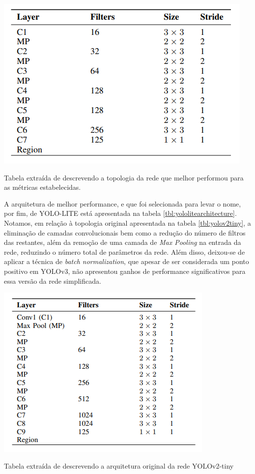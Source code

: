 \documentclass[]{politex}
\begin{document}
\begin{table}[ht]
  \centering
  \includegraphics[scale=0.55]{img/yololite.png}
  \caption{Tabela extraída de \citeyear{yololite} \citeauthor{yololite} descrevendo a topologia da rede que melhor performou para as métricas estabelecidas.}
  \label{tbl:yololitearchitecture}
\end{table}

A arquitetura de melhor performance, e que foi selecionada para levar o nome, por fim, de YOLO-LITE está apresentada na tabela \ref{tbl:yololitearchitecture}. Notamos, em relação à topologia original apresentada na tabela \ref{tbl:yolov2tiny}, a eliminação de camadas convolucionais bem como a redução do número de filtros das restantes, além da remoção de uma camada de \textit{Max Pooling} na entrada da rede, reduzindo o número total de parâmetros da rede. Além disso, deixou-se de aplicar a técnica de \textit{batch normalization}, que apesar de ser considerada um ponto positivo em YOLOv3, não apresentou ganhos de performance significativos para essa versão da rede simplificada.

\begin{table}[ht]
  \centering
  \includegraphics[scale=0.66]{img/yolov2tiny.png}
  \caption{Tabela extraída de \citeyear{yololite} \citeauthor{yololite} descrevendo a arquitetura original da rede YOLOv2-tiny}
  \label{tbl:yolov2tiny}
\end{table}
\end{document}
